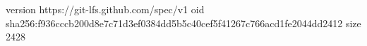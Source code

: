 version https://git-lfs.github.com/spec/v1
oid sha256:f936cccb200d8e7c71d3ef0384dd5b5c40cef5f41267c766acd1fe2044dd2412
size 2428
